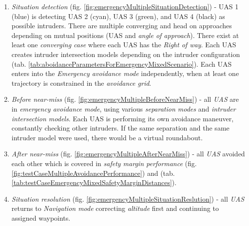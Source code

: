     \begin{enumerate}
        \item \emph{Situation detection} (fig. \ref{fig:emergencyMultipleSituationDetection}) - UAS 1 (blue) is detecting UAS 2 (cyan), UAS 3 (green), and UAS 4 (black) as possible intruders. There are multiple converging and head on approaches depending on mutual positions (UAS and \emph{angle of approach}). There exist at least one \emph{converging case} where each UAS has the \emph{Right of way}. Each UAS creates intruder intersection models depending on the intruder configuration (tab. \ref{tab:aboidanceParametersForEmergencyMixedScenario}). Each UAS enters into the \emph{Emergency avoidance mode} independently, when at least one trajectory is constrained in the \emph{avoidance grid}. 
        
        \item \emph{Before near-miss} (fig. \ref{fig:emergencyMultipleBeforeNearMiss}) - all \emph{UAS} are in \emph{emergency avoidance mode}, using various \emph{separation modes} and \emph{intruder intersection models}. Each UAS is performing its own avoidance maneuver, constantly checking other intruders. If the same separation and the same intruder model were used, there would be a virtual roundabout.
            
        \item \emph{After near-miss} (fig. \ref{fig:emergencyMultipleAfterNearMiss}) - all \emph{UAS} avoided each other which is covered in \emph{safety margin performance} (fig. \ref{fig:testCaseMultipleAvoidancePerformance}) and (tab. \ref{tab:testCaseEmergencyMixedSafetyMarginDistances}).
        
        \item \emph{Situation resolution} (fig. \ref{fig:emergencyMultipleSituationReslution}) - all \emph{UAS}
        returns to \emph{Navigation mode} correcting \emph{altitude} first and continuing to assigned waypoints.
    \end{enumerate}
    

